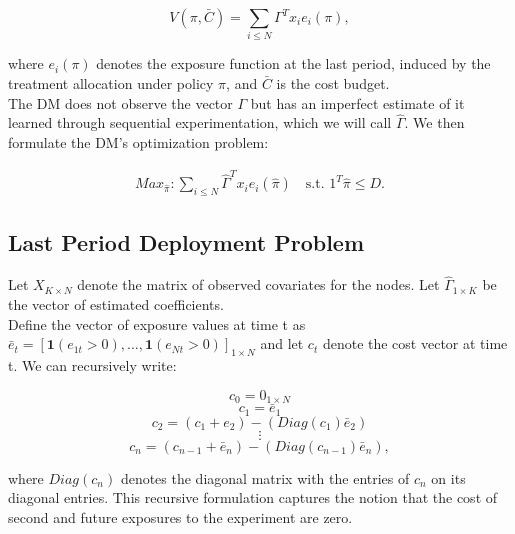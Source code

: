 \documentclass[12pt,a4paper]{article}
\begin{document}
$$V(\pi, \bar{C})=\sum_{i \leq N} \Gamma^T x_i e_i(\pi), $$

where $e_i(\pi)$ denotes the exposure function at the last period, induced by the treatment allocation under policy $\pi$, and $\bar{C}$ is the cost budget. \\

The DM does not observe the vector $\Gamma$ but has an imperfect estimate of it learned through sequential experimentation, which we will call $\hat \Gamma$. We then formulate the DM's optimization problem:

\begin{align}\label{eq:dm_opti}
Max_{\hat \pi} : \sum_{i \leq N} \hat \Gamma^T x_i e_i(\hat \pi)  \quad \mbox{s.t. } 1^T \hat \pi \leq D .
\end{align}

\iffalse
This ends up being equivalent to this minimization (the equivalence to be clarified later):
%

$$ Min_{\hat \pi} E \left( Sup_\pi \left(\sum_{i \leq N} \Gamma^T x_i e_i(\pi) - c_\infty(\pi) \right) - \sum_{i \leq N} \hat \Gamma^T x_i e_i(\hat \pi) + c_\infty(\hat \pi) \right) $$
%
OR (depending on how $\hat \Gamma \rightarrow \Gamma$).

$$ Min_{\pi} E \left( Sup_\pi \left(\sum_{i \leq N} \Gamma^T x_i e_i(\pi) - c_\infty \right) - \sum_{i \leq N}  \Gamma^T x_i e_i(\pi) + \hat c_\infty \right) $$
\fi

\subsection{Last Period Deployment Problem}

Let $X_{K \times N}$ denote the matrix of observed covariates for the nodes. Let $\hat \Gamma _{1 \times K}$ be the vector of estimated coefficients.\\

Define the vector of exposure values at time t as $\bar e_t=[\mathbf{1}(e_{1t}>0), \dots, \mathbf{1}(e_{Nt}>0)]_{1 \times N}$ and let $c_t$ denote the cost vector at time t.  We can recursively write:

$$c_0 = 0_{1 \times N}$$
$$c_1 = \bar e_1$$
$$c_2 = (c_1 + e_2) - (Diag(c_1)  \bar e_2)$$
$$\vdots$$
$$c_n = (c_{n-1} + \bar e_n) - (Diag(c_{n-1})  \bar e_n), $$

where $Diag(c_n)$ denotes the diagonal matrix with the entries of $c_n$ on its diagonal entries. This recursive formulation captures the notion that the cost of second and future exposures to the experiment are zero.\\
\end{document}
